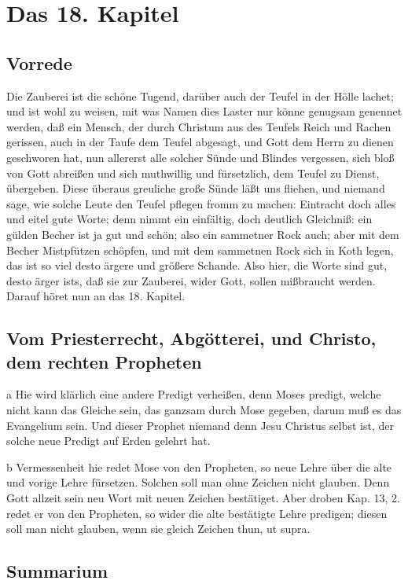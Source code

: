 \chapter{Das 18. Kapitel}

\section{Vorrede}

Die Zauberei ist die schöne Tugend, darüber auch der Teufel in der Hölle lachet; und ist wohl zu weisen, mit was Namen dies Laster nur könne genugsam genennet werden, daß ein Mensch, der durch Christum aus des Teufels Reich und Rachen gerissen, auch in der Taufe dem Teufel abgesagt, und Gott dem Herrn zu dienen geschworen hat, nun allererst alle solcher Sünde und Blindes vergessen, sich bloß von Gott abreißen und sich muthwillig und fürsetzlich, dem Teufel zu Dienst, übergeben. Diese überaus greuliche große Sünde läßt uns fliehen, und niemand sage, wie solche Leute den Teufel pflegen fromm zu machen: Eintracht doch alles und eitel gute Worte; denn nimmt ein einfältig, doch deutlich Gleichniß: ein gülden Becher ist ja gut und schön; also ein sammetner Rock auch; aber mit dem Becher Mistpfützen schöpfen, und mit dem sammetnen Rock sich in Koth legen, das ist so viel desto ärgere und größere Schande. Also hier, die Worte sind gut, desto ärger ists, daß sie zur Zauberei, wider Gott, sollen mißbraucht werden. Darauf höret nun an das 18. Kapitel.

\section{Vom Priesterrecht, Abgötterei, und Christo, dem rechten Propheten}

a Hie wird klärlich eine andere Predigt verheißen, denn Moses predigt, welche nicht kann das Gleiche sein, das ganzsam durch Mose gegeben, darum muß es das Evangelium sein. Und dieser Prophet niemand denn Jesu Christus selbst ist, der solche neue Predigt auf Erden gelehrt hat.

b Vermessenheit hie redet Mose von den Propheten, so neue Lehre über die alte und vorige Lehre fürsetzen. Solchen soll man ohne Zeichen nicht glauben. Denn Gott allzeit sein neu Wort mit neuen Zeichen bestätiget. Aber droben Kap. 13, 2. redet er von den Propheten, so wider die alte bestätigte Lehre predigen; diesen soll man nicht glauben, wenn sie gleich Zeichen thun, ut supra.

\section{Summarium}

